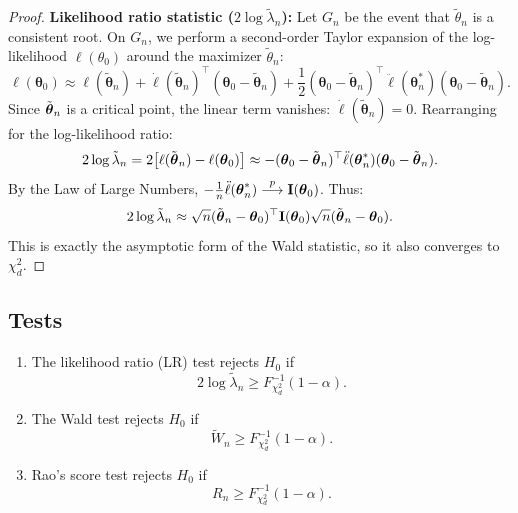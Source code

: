 \begin{proof}
\textbf{Likelihood ratio statistic ($2\log\tilde{\lambda}_n$):}
Let $G_n$ be the event that $\tilde{\theta}_n$ is a consistent root. On $G_n$, we perform a second-order Taylor expansion of the log-likelihood $\ell(\theta_0)$ around the maximizer $\tilde{\theta}_n$:
\[ \ell(\boldsymbol{\theta}_0) \approx \ell(\tilde{\boldsymbol{\theta}}_n) + \dot{\ell}(\tilde{\boldsymbol{\theta}}_n)^\top(\boldsymbol{\theta}_0 - \tilde{\boldsymbol{\theta}}_n) + \frac{1}{2}(\boldsymbol{\theta}_0 - \tilde{\boldsymbol{\theta}}_n)^\top \ddot{\ell}(\boldsymbol{\theta}_n^*)(\boldsymbol{\theta}_0 - \tilde{\boldsymbol{\theta}}_n). \]
Since $\tilde{\boldsymbol{\theta}}_n$ is a critical point, the linear term vanishes: $\dot{\ell}(\tilde{\boldsymbol{\theta}}_n) = 0$.
Rearranging for the log-likelihood ratio:
\[ 2\log\tilde{\lambda}_n = 2\big[\ell(\tilde{\boldsymbol{\theta}}_n) - \ell(\boldsymbol{\theta}_0)\big] \approx -(\boldsymbol{\theta}_0 - \tilde{\boldsymbol{\theta}}_n)^\top \ddot{\ell}(\boldsymbol{\theta}_n^*)(\boldsymbol{\theta}_0 - \tilde{\boldsymbol{\theta}}_n). \]
By the Law of Large Numbers, $-\frac{1}{n}\ddot{\ell}(\boldsymbol{\theta}_n^*) \stackrel{p}{\longrightarrow} \mathbf{I}(\boldsymbol{\theta}_0)$. Thus:
\[ 2\log\tilde{\lambda}_n \approx \sqrt{n}(\tilde{\boldsymbol{\theta}}_n - \boldsymbol{\theta}_0)^\top \mathbf{I}(\boldsymbol{\theta}_0) \sqrt{n}(\tilde{\boldsymbol{\theta}}_n - \boldsymbol{\theta}_0). \]
This is exactly the asymptotic form of the Wald statistic, so it also converges to $\chi^2_d$.
\end{proof}

\subsection{Tests}

\begin{enumerate}[label=\alph*)]
\item The likelihood ratio (LR) test rejects $H_0$ if
\begin{equation}
2 \log \tilde{\lambda}_n \ge F^{-1}_{\chi^2_d}(1-\alpha).
\end{equation}

\item The Wald test rejects $H_0$ if
\begin{equation}
\widetilde{W}_n \ge F^{-1}_{\chi^2_d}(1-\alpha).
\end{equation}

\item Rao's score test rejects $H_0$ if
\begin{equation}
R_n \ge F^{-1}_{\chi^2_d}(1-\alpha).
\end{equation}
\end{enumerate}

